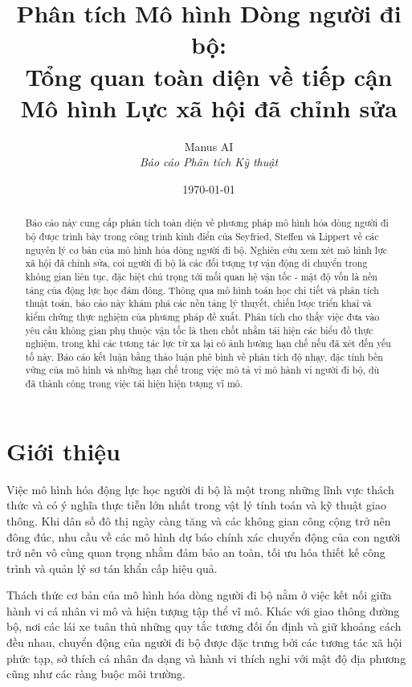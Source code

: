 \documentclass[12pt,a4paper]{article}
\title{\textbf{Phân tích Mô hình Dòng người đi bộ: \\
Tổng quan toàn diện về tiếp cận Mô hình Lực xã hội đã chỉnh sửa}}
\author{Manus AI \\
\textit{Báo cáo Phân tích Kỹ thuật}}
\date{\today}
\begin{document}
\maketitle

\begin{abstract}
Báo cáo này cung cấp phân tích toàn diện về phương pháp mô hình hóa dòng người đi bộ được trình bày trong công trình kinh điển của Seyfried, Steffen và Lippert về các nguyên lý cơ bản của mô hình hóa dòng người đi bộ. Nghiên cứu xem xét mô hình lực xã hội đã chỉnh sửa, coi người đi bộ là các đối tượng tự vận động di chuyển trong không gian liên tục, đặc biệt chú trọng tới mối quan hệ vận tốc - mật độ vốn là nền tảng của động lực học đám đông. Thông qua mô hình toán học chi tiết và phân tích thuật toán, báo cáo này khám phá các nền tảng lý thuyết, chiến lược triển khai và kiểm chứng thực nghiệm của phương pháp đề xuất. Phân tích cho thấy việc đưa vào yêu cầu không gian phụ thuộc vận tốc là then chốt nhằm tái hiện các biểu đồ thực nghiệm, trong khi các tương tác lực từ xa lại có ảnh hưởng hạn chế nếu đã xét đến yếu tố này. Báo cáo kết luận bằng thảo luận phê bình về phân tích độ nhạy, đặc tính bền vững của mô hình và những hạn chế trong việc mô tả vi mô hành vi người đi bộ, dù đã thành công trong việc tái hiện hiện tượng vĩ mô.
\end{abstract}

\newpage
\tableofcontents
\newpage

\section{Giới thiệu}

Việc mô hình hóa động lực học người đi bộ là một trong những lĩnh vực thách thức và có ý nghĩa thực tiễn lớn nhất trong vật lý tính toán và kỹ thuật giao thông. Khi dân số đô thị ngày càng tăng và các không gian công cộng trở nên đông đúc, nhu cầu về các mô hình dự báo chính xác chuyển động của con người trở nên vô cùng quan trọng nhằm đảm bảo an toàn, tối ưu hóa thiết kế công trình và quản lý sơ tán khẩn cấp hiệu quả.

Thách thức cơ bản của mô hình hóa dòng người đi bộ nằm ở việc kết nối giữa hành vi cá nhân vi mô và hiện tượng tập thể vĩ mô. Khác với giao thông đường bộ, nơi các lái xe tuân thủ những quy tắc tương đối ổn định và giữ khoảng cách đều nhau, chuyển động của người đi bộ được đặc trưng bởi các tương tác xã hội phức tạp, sở thích cá nhân đa dạng và hành vi thích nghi với mật độ địa phương cũng như các ràng buộc môi trường.
\end{document}
